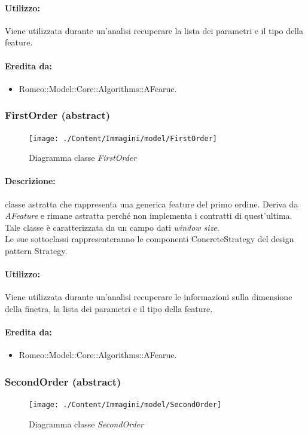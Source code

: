 	\paragraph{Utilizzo:} Viene utilizzata durante un’analisi recuperare la lista dei parametri e il tipo della feature\g{}.
	\paragraph{Eredita da:}
		\begin{itemize}
			\item Romeo::Model::Core::Algorithms::AFearue.
		\end{itemize}
	\subsubsection{FirstOrder (abstract)}
	\begin{figure}[!h]
		\centering
		\texttt{[image: ./Content/Immagini/model/FirstOrder]}
		\caption{Diagramma classe \textsl{FirstOrder}}
	\end{figure}
	\paragraph{Descrizione:} classe astratta che rappresenta una generica feature\g{} del primo ordine. Deriva da \textsl{AFeature} e rimane astratta perché non implementa i contratti di quest’ultima. 
\\Tale classe è caratterizzata da un campo dati \textit{window size}. 
\\Le sue sottoclassi rappresenteranno le componenti ConcreteStrategy del design pattern\g{} Strategy.
	\paragraph{Utilizzo:} Viene utilizzata durante un’analisi recuperare le informazioni sulla dimensione della finetra, la lista dei parametri e il tipo della feature\g{}.
	\paragraph{Eredita da:}
		\begin{itemize}
			\item Romeo::Model::Core::Algorithms::AFearue.
		\end{itemize}
	\subsubsection{SecondOrder (abstract)}
	\begin{figure}[!h]
		\centering
		\texttt{[image: ./Content/Immagini/model/SecondOrder]}
		\caption{Diagramma classe \textsl{SecondOrder}}
	\end{figure}
